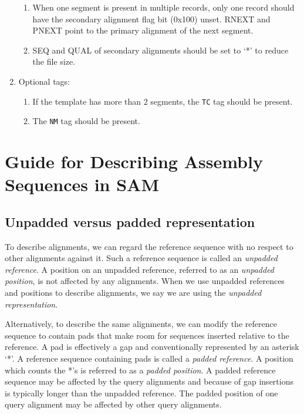 \documentclass[10pt]{article}
\begin{document}
\begin{enumerate}
\begin{enumerate}[label*=\arabic*]
  \item When one segment is present in multiple records, only one
    record should have the secondary alignment flag bit (0x100)
    unset. {\sf RNEXT} and {\sf PNEXT} point to the primary alignment of
    the next segment.
  \item {\sf SEQ} and {\sf QUAL} of secondary alignments should be set
    to `*' to reduce the file size.
  \end{enumerate}
\item Optional tags:
  \begin{enumerate}[label*=\arabic*]
  \item If the template has more than 2 segments, the {\tt TC} tag
    should be present.
  \item The {\tt NM} tag should be present.
  \end{enumerate}
\end{enumerate}

\pagebreak

\section{Guide for Describing Assembly Sequences in SAM}

\subsection{Unpadded versus padded representation}

To describe alignments, we can regard the reference sequence with no respect to
other alignments against it.  Such a reference sequence is called an
\emph{unpadded reference}. A position on an unpadded reference, referred to
as an \emph{unpadded position}, is not affected by any alignments. When we use
unpadded references and positions to describe alignments, we say we are using
the \emph{unpadded representation}.

Alternatively, to describe the same alignments, we can modify the reference
sequence to contain pads that make room for sequences inserted relative to the
reference. A pad is effectively a gap and conventionally represented by an
asterisk `*'.  A reference sequence containing pads is called a \emph{padded
reference}. A position which counts the *'s is referred to as a \emph{padded
position}. A padded reference sequence may be affected by the query alignments
and because of gap insertions is typically longer than the unpadded reference.
The padded position of one query alignment may be affected by other query
alignments.
\end{document}
